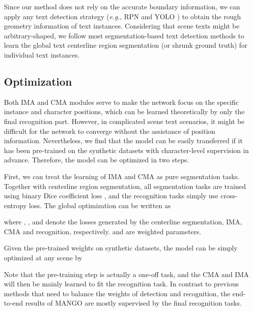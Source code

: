 \documentclass[letterpaper]{article} \usepackage{aaai21}  \usepackage{times}  \usepackage{helvet} \usepackage{courier}  \usepackage[hyphens]{url}  \usepackage{graphicx} \urlstyle{rm} \def\UrlFont{\rm}  \usepackage{natbib}  \usepackage{caption} \frenchspacing  \setlength{\pdfpagewidth}{8.5in}  \setlength{\pdfpageheight}{11in}  \usepackage{multirow}
\begin{document}
Since our method does not rely on the accurate boundary information, we can apply any text detection strategy (\emph{e.g.}, RPN \cite{2015Faster} and YOLO \cite{Redmon2016You}) to obtain the rough geometry information of text instances.
Considering that scene texts might be arbitrary-shaped, we follow most segmentation-based text detection methods \cite{long2018textsnake, Wang2019Shape} to learn the global text centerline region segmentation (or shrunk ground truth) for individual text instances.

\subsection{Optimization}
Both IMA and CMA modules serve to make the network focus on the specific instance and character positions, which can be learned theoretically by only the final recognition part.
However, in complicated scene text scenarios,  it might be difficult for the network to converge without the assistance of position information.
Nevertheless, we find that the model can be easily transferred if it has been pre-trained on the synthetic datasets with character-level supervision in advance. Therefore, the model can be optimized in two steps.

First, we can treat the learning of IMA and CMA as pure segmentation tasks. Together with centerline region segmentation, all segmentation tasks are trained using binary Dice coefficient loss \cite{milletari2016v}, and the recognition tasks simply use cross-entropy loss.
The global optimization can be written as

where , ,  and  denote the losses generated by the centerline segmentation, IMA, CMA and recognition, respectively.  and  are weighted parameters.

Given the pre-trained weights on synthetic datasets, the model can be simply optimized at any scene by


Note that the pre-training step is actually a one-off task, and the CMA and IMA will then be mainly learned to fit the recognition task. In contrast to previous methods that need to balance the weights of detection and recognition, the end-to-end results of MANGO are mostly supervised by the final recognition tasks.
\end{document}
